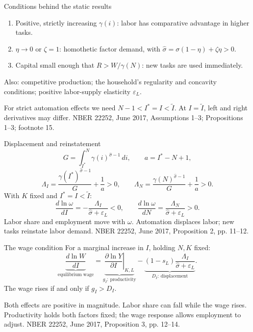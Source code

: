 \documentclass[aspectratio=169,11pt]{beamer}
\newcommand{\src}[1]{\vfill{\scriptsize\color{gray}NBER 22252, June 2017, #1.}}
\newcommand{\sh}{\widehat\sigma}
\begin{document}
\begin{frame}{Conditions behind the static results}
\begin{enumerate}
\item Positive, strictly increasing $\gamma(i)$: labor has comparative advantage in higher tasks.
\item $\eta\to0$ or $\zeta=1$: homothetic factor demand, with $\sh=\sigma(1-\eta)+\zeta\eta>0$.
\item Capital small enough that $R>W/\gamma(N)$: new tasks are used immediately.
\end{enumerate}
\par\medskip
Also: competitive production; the household's regularity and concavity conditions; positive labor-supply elasticity $\varepsilon_L$.
\par\medskip
For strict automation effects we need $N-1<I^*=I<\widetilde I$. At $I=\widetilde I$, left and right derivatives may differ.
\src{Assumptions 1--3; Propositions 1--3; footnote 15}
\end{frame}

\begin{frame}{Displacement and reinstatement}
\[
G=\int_{I^*}^{N}\gamma(i)^{\sh-1}\,di,\qquad a=I^*-N+1,
\]
\[
\Lambda_I=\frac{\gamma(I^*)^{\sh-1}}G+\frac1a>0,
\qquad\Lambda_N=\frac{\gamma(N)^{\sh-1}}G+\frac1a>0.
\]
With $K$ fixed and $I^*=I<\widetilde I$:
\[
\frac{d\ln\omega}{dI}=-\frac{\Lambda_I}{\sh+\varepsilon_L}<0,
\qquad\frac{d\ln\omega}{dN}=\frac{\Lambda_N}{\sh+\varepsilon_L}>0.
\]
Labor share and employment move with $\omega$. Automation displaces labor; new tasks reinstate labor demand.
\src{Proposition 2, pp. 11--12}
\end{frame}

\begin{frame}{The wage condition}
For a marginal increase in $I$, holding $N,K$ fixed:
\[
\underbrace{\frac{d\ln W}{dI}}_{\text{equilibrium wage}}
=\underbrace{\left.\frac{\partial\ln Y}{\partial I}\right|_{K,L}}_{g_I:\ \text{productivity}}
-\underbrace{(1-s_L)\frac{\Lambda_I}{\sh+\varepsilon_L}}_{D_I:\ \text{displacement}}.
\]
\bigskip
\centering\Large\color{teal}The wage rises if and only if $g_I>D_I$.
\par\par\medskip\normalsize\color{ink}\raggedright
Both effects are positive in magnitude. Labor share can fall while the wage rises. Productivity holds both factors fixed; the wage response allows employment to adjust.
\src{Proposition 3, pp. 12--14}
\end{frame}
\end{document}
